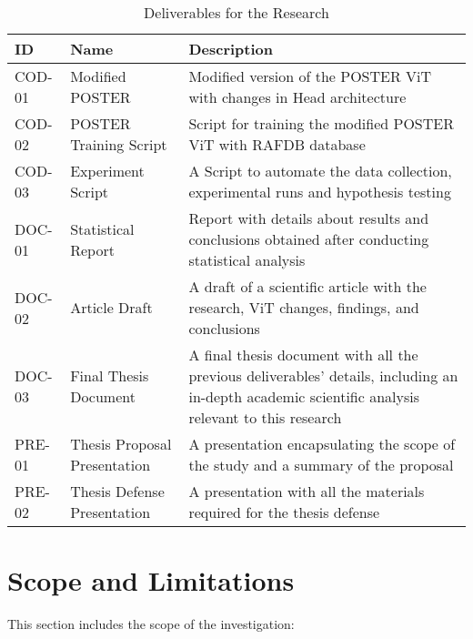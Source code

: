 \renewcommand{\arraystretch}{2.5}
\begin{table}[H]
\label{tb:table_deliverable}
\caption{Deliverables for the Research}
\begin{tabular}{@{}llp{10cm}@{}}
\toprule
\textbf{ID} & \textbf{Name} & \textbf{Description} \\ \midrule
COD-01 & Modified POSTER & 
\parbox[t]{10cm}{Modified version of the POSTER ViT with changes in Head architecture} \\
COD-02 & POSTER Training Script & 
\parbox[t]{10cm}{Script for training the modified POSTER ViT with RAFDB database} \\
COD-03 & Experiment Script & 
\parbox[t]{10cm}{A Script to automate the data collection, experimental runs and hypothesis testing
} \\
DOC-01 & Statistical Report & 
\parbox[t]{10cm}{Report with details about results and conclusions obtained after conducting statistical analysis} \\
DOC-02 & Article Draft & 
\parbox[t]{10cm}{A draft of a scientific article with the research, ViT changes, findings, and conclusions} \\
DOC-03 & Final Thesis Document & 
\parbox[t]{10cm}{A final thesis document with all the previous deliverables' details, including an in-depth academic scientific analysis relevant to this research} \\
PRE-01 & Thesis Proposal Presentation & 
\parbox[t]{10cm}{A presentation encapsulating the scope of the study and a summary of the proposal} \\
PRE-02 & Thesis Defense Presentation & 
\parbox[t]{10cm}{A presentation with all the materials required for the thesis defense} \\ 
\bottomrule
\end{tabular}
\end{table}

\section{Scope and Limitations}

This section includes the scope of the investigation:


